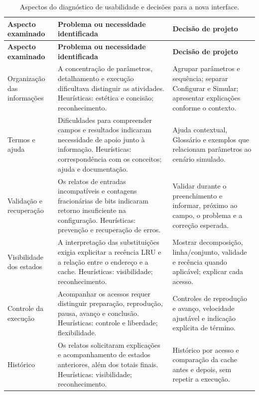 \begin{longtable}{@{}P{3.0cm}P{5.7cm}P{5.1cm}@{}}
\caption{Aspectos do diagnóstico de usabilidade e decisões para a nova interface.}\label{tab:inspecao-usabilidade}\\
\toprule\textbf{Aspecto examinado} & \textbf{Problema ou necessidade identificada} & \textbf{Decisão de projeto}\\\midrule\endfirsthead
\toprule\textbf{Aspecto examinado} & \textbf{Problema ou necessidade identificada} & \textbf{Decisão de projeto}\\\midrule\endhead
Organização das informações & A concentração de parâmetros, detalhamento e execução dificultava distinguir as atividades. Heurísticas: estética e concisão; reconhecimento. & Agrupar parâmetros e sequência; separar Configurar e Simular; apresentar explicações conforme o contexto.\\\midrule
Termos e ajuda & Dificuldades para compreender campos e resultados indicaram necessidade de apoio junto à informação. Heurísticas: correspondência com os conceitos; ajuda e documentação. & Ajuda contextual, Glossário e exemplos que relacionam parâmetros ao cenário simulado.\\\midrule
Validação e recuperação & Os relatos de entradas incompatíveis e contagens fracionárias de bits indicaram retorno insuficiente na configuração. Heurísticas: prevenção e recuperação de erros. & Validar durante o preenchimento e informar, próximo ao campo, o problema e a correção esperada.\\\midrule
Visibilidade dos estados & A interpretação das substituições exigia explicitar a recência LRU e a relação entre o endereço e a cache. Heurísticas: visibilidade; reconhecimento. & Mostrar decomposição, linha/conjunto, validade e recência quando aplicável; explicar cada acesso.\\\midrule
Controle da execução & Acompanhar os acessos requer distinguir preparação, reprodução, pausa, avanço e conclusão. Heurísticas: controle e liberdade; flexibilidade. & Controles de reprodução e avanço, velocidade ajustável e indicação explícita de término.\\\midrule
Histórico & Os relatos solicitaram explicações e acompanhamento de estados anteriores, além dos totais finais. Heurísticas: visibilidade; reconhecimento. & Histórico por acesso e comparação da cache antes e depois, sem repetir a execução.\\
\bottomrule
\end{longtable}

